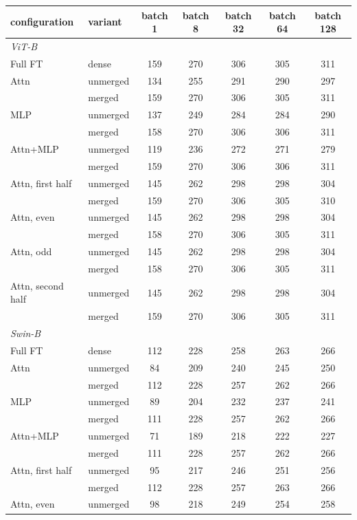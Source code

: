 \begin{table}[H]
\centering\footnotesize
\setlength{\tabcolsep}{3.5pt}
\begin{tabular}{llccccc}
\toprule
configuration & variant & batch 1 & batch 8 & batch 32 & batch 64 & batch 128 \\
\midrule
\multicolumn{7}{l}{\emph{ViT-B}} \\
Full FT & dense & 159 & 270 & 306 & 305 & 311 \\
Attn & unmerged & 134 & 255 & 291 & 290 & 297 \\
 & merged & 159 & 270 & 306 & 305 & 311 \\
MLP & unmerged & 137 & 249 & 284 & 284 & 290 \\
 & merged & 158 & 270 & 306 & 306 & 311 \\
Attn+MLP & unmerged & 119 & 236 & 272 & 271 & 279 \\
 & merged & 159 & 270 & 306 & 306 & 311 \\
Attn, first half & unmerged & 145 & 262 & 298 & 298 & 304 \\
 & merged & 159 & 270 & 306 & 305 & 310 \\
Attn, even & unmerged & 145 & 262 & 298 & 298 & 304 \\
 & merged & 158 & 270 & 306 & 305 & 311 \\
Attn, odd & unmerged & 145 & 262 & 298 & 298 & 304 \\
 & merged & 158 & 270 & 306 & 305 & 311 \\
Attn, second half & unmerged & 145 & 262 & 298 & 298 & 304 \\
 & merged & 159 & 270 & 306 & 305 & 311 \\
\midrule
\multicolumn{7}{l}{\emph{Swin-B}} \\
Full FT & dense & 112 & 228 & 258 & 263 & 266 \\
Attn & unmerged & 84 & 209 & 240 & 245 & 250 \\
 & merged & 112 & 228 & 257 & 262 & 266 \\
MLP & unmerged & 89 & 204 & 232 & 237 & 241 \\
 & merged & 111 & 228 & 257 & 262 & 266 \\
Attn+MLP & unmerged & 71 & 189 & 218 & 222 & 227 \\
 & merged & 111 & 228 & 257 & 262 & 266 \\
Attn, first half & unmerged & 95 & 217 & 246 & 251 & 256 \\
 & merged & 112 & 228 & 257 & 263 & 266 \\
Attn, even & unmerged & 98 & 218 & 249 & 254 & 258 \\

\end{tabular}
\end{table}
